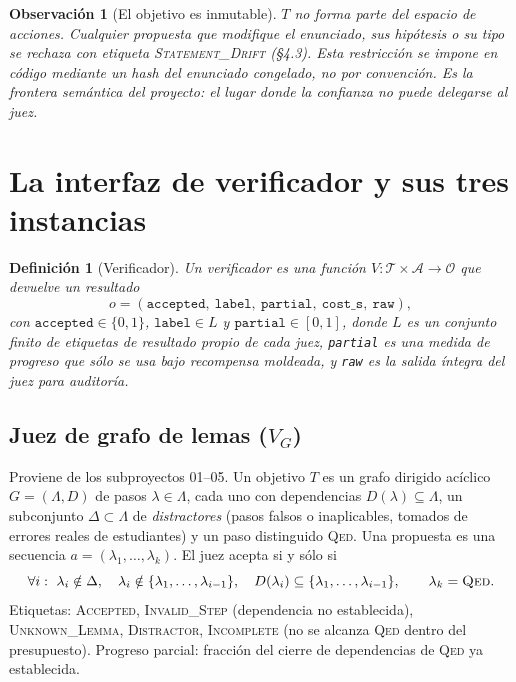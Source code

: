 \documentclass[11pt,a4paper]{article}
\newtheorem{definition}{Definición}
\newtheorem{remark}{Observación}
\begin{document}
\begin{remark}[El objetivo es inmutable]
$T$ no forma parte del espacio de acciones. Cualquier propuesta que modifique el enunciado, sus hipótesis o su tipo se rechaza con etiqueta \textsc{Statement\_Drift} (§4.3). Esta restricción se impone en código mediante un hash del enunciado congelado, no por convención. Es la \emph{frontera semántica} del proyecto: el lugar donde la confianza no puede delegarse al juez.
\end{remark}

\section{La interfaz de verificador y sus tres instancias}

\begin{definition}[Verificador]
Un verificador es una función $V : \mathcal{T} \times \mathcal{A} \to \mathcal{O}$ que devuelve un \emph{resultado}
\[
  o = (\texttt{accepted},\ \texttt{label},\ \texttt{partial},\ \texttt{cost\_s},\ \texttt{raw}),
\]
con $\texttt{accepted}\in\{0,1\}$, $\texttt{label}\in L$ y $\texttt{partial}\in[0,1]$,
donde $L$ es un conjunto finito de etiquetas de resultado propio de cada juez, \texttt{partial} es una medida de progreso que sólo se usa bajo recompensa moldeada, y \texttt{raw} es la salida íntegra del juez para auditoría.
\end{definition}

\subsection{Juez de grafo de lemas ($V_G$)}

Proviene de los subproyectos 01--05. Un objetivo $T$ es un grafo dirigido acíclico $G = (\Lambda, D)$ de pasos $\lambda \in \Lambda$, cada uno con dependencias $D(\lambda) \subseteq \Lambda$, un subconjunto $\Delta \subset \Lambda$ de \emph{distractores} (pasos falsos o inaplicables, tomados de errores reales de estudiantes) y un paso distinguido \textsc{Qed}. Una propuesta es una secuencia $a = (\lambda_1, \dots, \lambda_k)$. El juez acepta si y sólo si
\[
  \forall i:\ \lambda_i \notin \Delta,\quad \lambda_i \notin \{\lambda_1,\dots,\lambda_{i-1}\},\quad D(\lambda_i) \subseteq \{\lambda_1,\dots,\lambda_{i-1}\},\qquad \lambda_k = \textsc{Qed}.
\]
Etiquetas: \textsc{Accepted}, \textsc{Invalid\_Step} (dependencia no establecida), \textsc{Unknown\_Lemma}, \textsc{Distractor}, \textsc{Incomplete} (no se alcanza \textsc{Qed} dentro del presupuesto). Progreso parcial: fracción del cierre de dependencias de \textsc{Qed} ya establecida.
\end{document}
